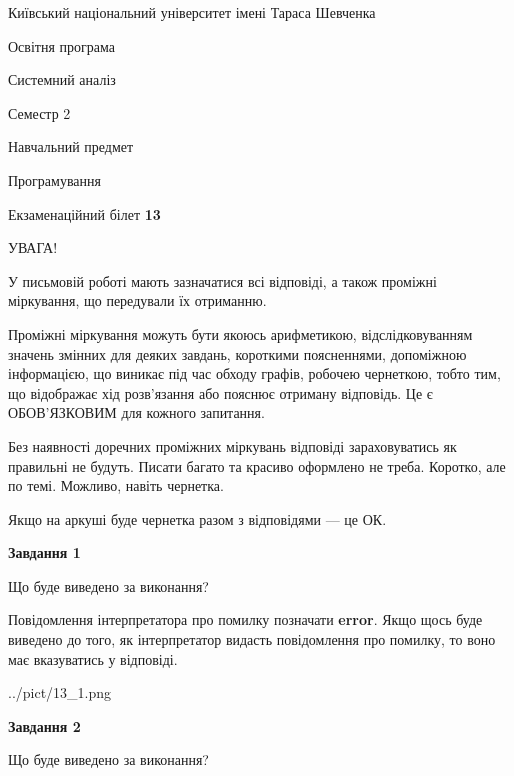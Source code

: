 \documentclass[12pt, ukrainian]{article}
\begin{document}
{{\begin {small}\par
{ \center  Київський національний університет імені Тараса Шевченка \par}
{\parbox {5 cm}{Освітня програма \hfill}{\parbox {7 cm}{Системний аналіз \hfill}}\parbox {6 cm}{\hfill Семестр 2}}\par
{\parbox {5 cm} {Навчальний предмет \hfill}\parbox {7 cm}{Програмування \hfill}\parbox {6cm}{\hfill}\par}\vspace{-7pt} \end{small}}{\center Екзаменаційний білет \No \textbf
{ 13 }\par}}
{
\begin {large}
УВАГА!

У письмовій роботі мають зазначатися всі відповіді, а також проміжні міркування, що передували їх отриманню.

Проміжні міркування можуть бути якоюсь арифметикою, відслідковуванням зна\-чень змінних для деяких завдань,
короткими поясненнями, допоміжною інформацією, що виникає під час обходу графів, робочею чернеткою,
тобто тим, що відображає хід розв’язання або пояснює отриману відповідь.
Це є ОБОВ’ЯЗКОВИМ для кожного запитання.

Без наявності доречних проміжних міркувань відповіді зараховуватись як правиль\-ні не будуть.
Писати багато та красиво оформлено не треба. Коротко, але по темі. Можли\-во, навіть чернетка.

Якщо на аркуші буде чернетка разом з відповідями --- це ОК.

\newpage

{\begin {center}\textbf{Завдання 1}\end {center}}\par
Що буде виведено за виконання?

Повідомлення інтерпретатора про помилку позначати \textbf{error}.
Якщо щось буде виведено до того, як інтерпретатор видасть повідомлення про помилку, 
то воно має вказуватись у відповіді. \par


\begin{center}
	{../pict/13_1.png}
\end{center}
\newpage

{\begin {center}\textbf{Завдання 2}\end {center}}\par
Що буде виведено за виконання?


\end{large}}
\end{document}
